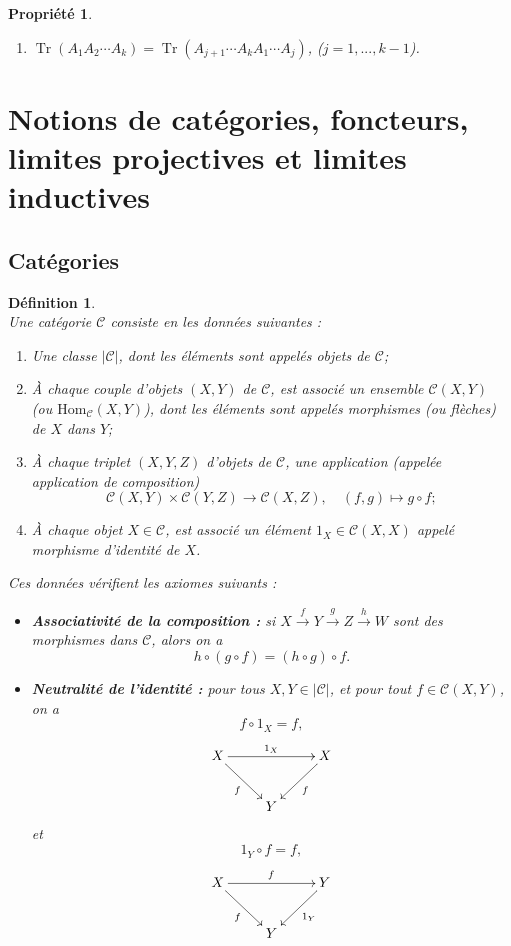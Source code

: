 \documentclass[a4paper, 14pt]{report}
\newtheorem{definition}{Définition}[section]
\newtheorem{propriety}{Propriété}[section]
\begin{document}
\begin{onehalfspace}
{\begin{propriety}
\begin{enumerate}
					\item \( \operatorname{Tr}(A_1 A_2 \cdots A_k) = \operatorname{Tr}(A_{j+1} \cdots A_k A_1 \cdots A_j) \),
					(\(j=1,...,k-1\)).
				\end{enumerate}
			\end{propriety}
			
			\section{Notions de catégories, foncteurs, limites projectives et limites inductives}
			
			\subsection{Catégories}
			
			\begin{definition} \cite{maclane1971categories} \\
				Une catégorie $\mathcal{C}$ consiste en les données suivantes :
				\begin{enumerate} [label=\roman*)]
					\item Une classe $|\mathcal{C}|$, dont les éléments sont appelés objets de $\mathcal{C}$;
					\item À chaque couple d'objets $(X, Y)$ de $\mathcal{C}$, est associé un ensemble $\mathcal{C}(X, Y)$ (ou $\mathrm{Hom}_{\mathcal{C}}(X, Y)$), dont les éléments sont appelés morphismes (ou flèches) de $X$ dans $Y$;
					\item À chaque triplet $(X, Y, Z)$ d'objets de $\mathcal{C}$, une application (appelée application de composition)
					\[
					\mathcal{C}(X, Y) \times \mathcal{C}(Y, Z) \to \mathcal{C}(X, Z), \quad (f, g) \mapsto g \circ f;
					\]
					\item À chaque objet $X \in \mathcal{C}$, est associé un élément $1_X \in \mathcal{C}(X, X)$ appelé morphisme d'identité de $X$.
				\end{enumerate}
				Ces données vérifient les axiomes suivants :
				\begin{itemize}
					\item \textbf{Associativité de la composition :}
					si $X \xrightarrow{f} Y \xrightarrow{g} Z \xrightarrow{h} W$ sont des morphismes dans $\mathcal{C}$, alors on a
					\[
					h \circ (g \circ f) = (h \circ g) \circ f.
					\]
					\item \textbf{Neutralité de l'identité :}
					pour tous $X, Y \in |\mathcal{C}|$, et pour tout $f \in \mathcal{C}(X, Y)$, on a
					\[
					f \circ 1_{X} = f,
					\]
					\[
					\xymatrix{
						X \ar[rr]^{1_{X}} \ar[dr]_{f} & & X \ar[dl]^{f} \\
						& Y &
					}
					\]
					et
					\[
					1_{Y} \circ f = f,
					\]
					\[
					\xymatrix{
						X \ar[rr]^{f} \ar[dr]_{f} & & Y \ar[dl]^{1_{Y}} \\
						& Y &
					}
					\]
				\end{itemize}
			\end{definition}
			
}
\end{onehalfspace}
\end{document}
